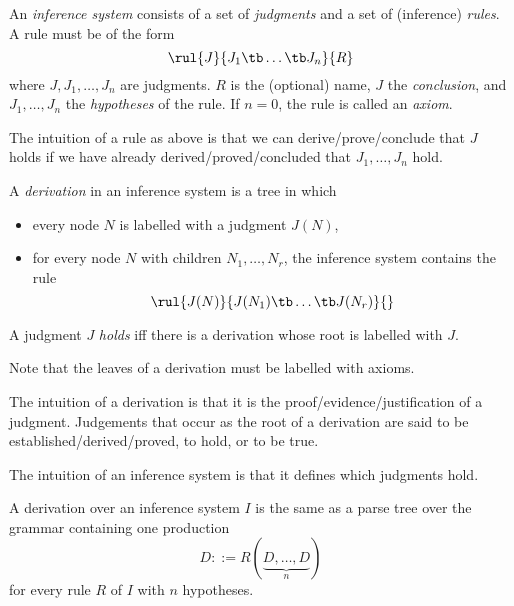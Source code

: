 \begin{definition}
An \emph{inference system} consists of a set of \emph{judgments} and a set of (inference) \emph{rules}. A rule must be of the form
 \[\rul{J}{J_1\tb \ldots \tb J_n}{R}\]
where $J,J_1,\ldots,J_n$ are judgments.
$R$ is the (optional) name, $J$ the \emph{conclusion}, and $J_1,\ldots,J_n$ the \emph{hypotheses} of the rule. If $n=0$, the rule is called an \emph{axiom}.
\end{definition}

The intuition of a rule as above is that we can derive/prove/conclude that $J$ holds if we have already derived/proved/concluded that $J_1,\ldots,J_n$ hold.

\begin{definition}[Derivation]
A \emph{derivation} in an inference system is a tree in which
\begin{itemize}
	\item every node $N$ is labelled with a judgment $J(N)$,
	\item for every node $N$ with children $N_1,\ldots,N_r$, the inference system contains the rule \[\rul{J(N)}{J(N_1)\tb \ldots \tb J(N_r)}{}\]
\end{itemize}

A judgment $J$ \emph{holds} iff there is a derivation whose root is labelled with $J$.
\end{definition}

\begin{remark}
Note that the leaves of a derivation must be labelled with axioms.

The intuition of a derivation is that it is the proof/evidence/justification of a judgment.
Judgements that occur as the root of a derivation are said to be established/derived/proved, to hold, or to be true.

The intuition of an inference system is that it defines which judgments hold.
\end{remark}

\begin{remark}
A derivation over an inference system $I$ is the same as a parse tree over the grammar containing one production
 \[D::= R(\underbrace{D,\ldots,D}_{n})\]
for every rule $R$ of $I$ with $n$ hypotheses.
\end{remark}
